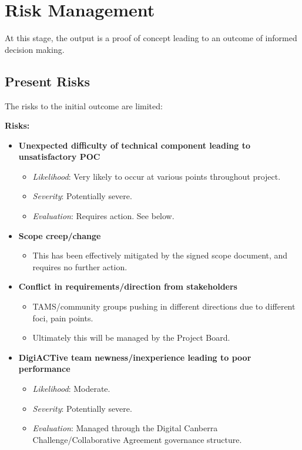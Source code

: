 \documentclass[12pt,a4paper,twosided]{article}
\begin{document}
\section{Risk Management}\label{risk-management}

At this stage, the output is a proof of concept leading to an outcome of
informed decision making.

\subsection{Present Risks}\label{present-risks}

The risks to the initial outcome are limited:

\textbf{Risks:}

\begin{itemize}
\itemsep1pt\parskip0pt
\item
  \textbf{Unexpected difficulty of technical component leading to
  unsatisfactory POC}

  \begin{itemize}
  \itemsep1pt\parskip0pt
  \item
    \emph{Likelihood}: Very likely to occur at various points throughout
    project.
  \item
    \emph{Severity}: Potentially severe.
  \item
    \emph{Evaluation}: Requires action. See below.
  \end{itemize}
\item
  \textbf{Scope creep/change}

  \begin{itemize}
  \itemsep1pt\parskip0pt
  \item
    This has been effectively mitigated by the signed scope document,
    and requires no further action.
  \end{itemize}
\item
  \textbf{Conflict in requirements/direction from stakeholders}

  \begin{itemize}
  \itemsep1pt\parskip0pt
  \item
    TAMS/community groups pushing in different directions due to
    different foci, pain points.
  \item
    Ultimately this will be managed by the Project Board.
  \end{itemize}
\item
  \textbf{DigiACTive team newness/inexperience leading to poor
  performance}

  \begin{itemize}
  \itemsep1pt\parskip0pt
  \item
    \emph{Likelihood}: Moderate.
  \item
    \emph{Severity}: Potentially severe.
  \item
    \emph{Evaluation}: Managed through the Digital Canberra
    Challenge/Collaborative Agreement governance structure.
  \end{itemize}
\end{itemize}
\end{document}
